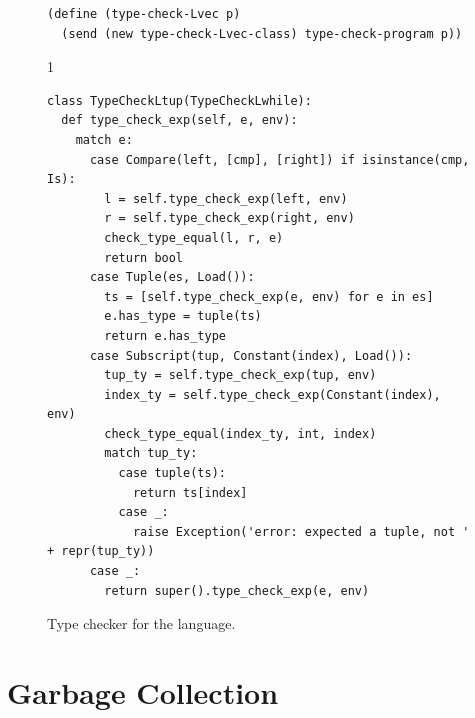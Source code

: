 \documentclass[7x10]{TimesAPriori_MIT}%
\def\pythonEd{1}
\def\edition{0}
\numberwithin{theorem}{chapter}
\numberwithin{definition}{chapter}
\numberwithin{equation}{chapter}
\begin{document}
\begin{figure}[tp]
\begin{tcolorbox}[colback=white]
{\begin{lstlisting}[basicstyle=\ttfamily\scriptsize]
(define (type-check-Lvec p)
  (send (new type-check-Lvec-class) type-check-program p))
\end{lstlisting}
\fi}
{\if\edition\pythonEd
\begin{lstlisting}
class TypeCheckLtup(TypeCheckLwhile):
  def type_check_exp(self, e, env):
    match e:
      case Compare(left, [cmp], [right]) if isinstance(cmp, Is):
        l = self.type_check_exp(left, env)
        r = self.type_check_exp(right, env)
        check_type_equal(l, r, e)
        return bool
      case Tuple(es, Load()):
        ts = [self.type_check_exp(e, env) for e in es]
        e.has_type = tuple(ts)
        return e.has_type
      case Subscript(tup, Constant(index), Load()):
        tup_ty = self.type_check_exp(tup, env)
        index_ty = self.type_check_exp(Constant(index), env)
        check_type_equal(index_ty, int, index)
        match tup_ty:
          case tuple(ts):
            return ts[index]
          case _:
            raise Exception('error: expected a tuple, not ' + repr(tup_ty))
      case _:
        return super().type_check_exp(e, env)
\end{lstlisting}
\fi}
  \end{tcolorbox}

  \caption{Type checker for the \LangVec{} language.}
\label{fig:type-check-Lvec}
\end{figure}


\section{Garbage Collection}
\label{sec:GC}
\end{document}
